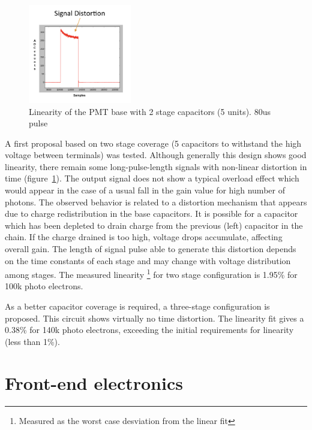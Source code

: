 \documentclass[a4paper, 10pt, oneside, twocolumn, 3p]{elsarticle}
\begin{document}
\begin{figure}
  \begin{center}
    \includegraphics[width=0.4\textwidth]{./figures/5C_base.png}
    \caption{Linearity of the PMT base with 2 stage capacitors (5 units). 80us pulse}
    \label{fig:5C}
  \end{center}
\end{figure}

\par A first proposal based on two stage coverage (5 capacitors to withstand the high voltage between terminals) was tested. Although generally this design shows good linearity, there remain some long-pulse-length signals with non-linear distortion in time (figure~\ref{fig:5C}). The output signal does not show a typical overload effect which would appear in the case of a usual fall in the gain value for high number of photons. The observed behavior is related to a distortion mechanism that appears due to charge redistribution in the base capacitors. It is possible for a capacitor which has been depleted to drain charge from the previous (left) capacitor in the chain. If the charge drained is too high, voltage drops accumulate, affecting overall gain. The length of signal pulse able to generate this distortion depends on the time constants of each stage and may change with voltage distribution among stages. The measured linearity \footnote{Measured as the worst case desviation from the linear fit} for two stage configuration is 1.95\% for 100k photo electrons. 

\par As a better capacitor coverage is required, a three-stage configuration is proposed. This circuit shows virtually no time distortion. The linearity fit gives a 0.38\% for 140k photo electrons, exceeding the initial requirements for linearity (less than 1\%).


\section{Front-end electronics}
\end{document}
